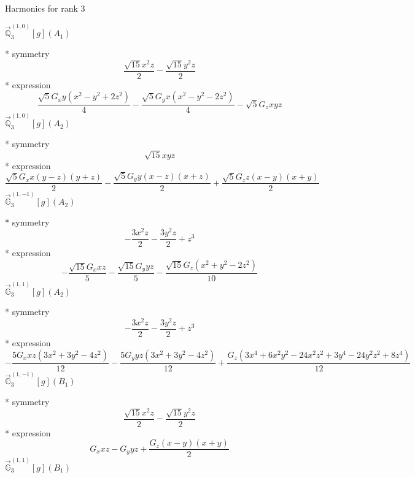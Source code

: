 \documentclass[fleqn,8pt]{jsarticle}
\begin{document}
\noindent * Harmonics for rank 3

\noindent\quad $\vec{\mathbb{Q}}_{3}^{(1,0)}[g](A_{1})$

\noindent\quad ** symmetry
\begin{dmath*}
\frac{\sqrt{15} x^{2} z}{2} - \frac{\sqrt{15} y^{2} z}{2}
\end{dmath*}
\noindent\quad ** expression
\begin{dmath*}
\frac{\sqrt{5} G_{x} y \left(x^{2} - y^{2} + 2 z^{2}\right)}{4} - \frac{\sqrt{5} G_{y} x \left(x^{2} - y^{2} - 2 z^{2}\right)}{4} - \sqrt{5} G_{z} x y z
\end{dmath*}
\noindent\quad $\vec{\mathbb{Q}}_{3}^{(1,0)}[g](A_{2})$

\noindent\quad ** symmetry
\begin{dmath*}
\sqrt{15} x y z
\end{dmath*}
\noindent\quad ** expression
\begin{dmath*}
\frac{\sqrt{5} G_{x} x \left(y - z\right) \left(y + z\right)}{2} - \frac{\sqrt{5} G_{y} y \left(x - z\right) \left(x + z\right)}{2} + \frac{\sqrt{5} G_{z} z \left(x - y\right) \left(x + y\right)}{2}
\end{dmath*}
\noindent\quad $\vec{\mathbb{G}}_{3}^{(1,-1)}[g](A_{2})$

\noindent\quad ** symmetry
\begin{dmath*}
- \frac{3 x^{2} z}{2} - \frac{3 y^{2} z}{2} + z^{3}
\end{dmath*}
\noindent\quad ** expression
\begin{dmath*}
- \frac{\sqrt{15} G_{x} x z}{5} - \frac{\sqrt{15} G_{y} y z}{5} - \frac{\sqrt{15} G_{z} \left(x^{2} + y^{2} - 2 z^{2}\right)}{10}
\end{dmath*}
\noindent\quad $\vec{\mathbb{G}}_{3}^{(1,1)}[g](A_{2})$

\noindent\quad ** symmetry
\begin{dmath*}
- \frac{3 x^{2} z}{2} - \frac{3 y^{2} z}{2} + z^{3}
\end{dmath*}
\noindent\quad ** expression
\begin{dmath*}
- \frac{5 G_{x} x z \left(3 x^{2} + 3 y^{2} - 4 z^{2}\right)}{12} - \frac{5 G_{y} y z \left(3 x^{2} + 3 y^{2} - 4 z^{2}\right)}{12} + \frac{G_{z} \left(3 x^{4} + 6 x^{2} y^{2} - 24 x^{2} z^{2} + 3 y^{4} - 24 y^{2} z^{2} + 8 z^{4}\right)}{12}
\end{dmath*}
\noindent\quad $\vec{\mathbb{G}}_{3}^{(1,-1)}[g](B_{1})$

\noindent\quad ** symmetry
\begin{dmath*}
\frac{\sqrt{15} x^{2} z}{2} - \frac{\sqrt{15} y^{2} z}{2}
\end{dmath*}
\noindent\quad ** expression
\begin{dmath*}
G_{x} x z - G_{y} y z + \frac{G_{z} \left(x - y\right) \left(x + y\right)}{2}
\end{dmath*}
\noindent\quad $\vec{\mathbb{G}}_{3}^{(1,1)}[g](B_{1})$
\end{document}
